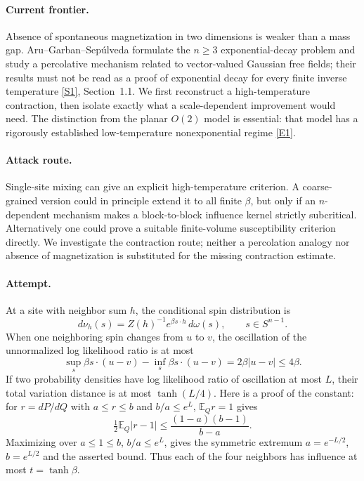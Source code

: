 \documentclass[11pt,a4paper]{article}
\newcommand{\E}{\mathbb{E}}
\newcommand{\sref}[2]{\hyperlink{source:#1:#2}{[S#2]}}
\newcommand{\eref}[2]{\hyperlink{extra:#1:#2}{[E#2]}}
\numberwithin{equation}{section}
\begin{document}
\paragraph{Current frontier.}
Absence of spontaneous magnetization in two dimensions is weaker than a mass gap. Aru--Garban--Sep\'ulveda formulate the $n\ge3$ exponential-decay problem and study a percolative mechanism related to vector-valued Gaussian free fields; their results must not be read as a proof of exponential decay for every finite inverse temperature \sref{187}{1}, Section~1.1. We first reconstruct a high-temperature contraction, then isolate exactly what a scale-dependent improvement would need. The distinction from the planar $O(2)$ model is essential: that model has a rigorously established low-temperature nonexponential regime \eref{187}{1}.

\paragraph{Attack route.}
Single-site mixing can give an explicit high-temperature criterion. A coarse-grained version could in principle extend it to all finite $\beta$, but only if an $n$-dependent mechanism makes a block-to-block influence kernel strictly subcritical. Alternatively one could prove a suitable finite-volume susceptibility criterion directly. We investigate the contraction route; neither a percolation analogy nor absence of magnetization is substituted for the missing contraction estimate.

\paragraph{Attempt.}
At a site with neighbor sum $h$, the conditional spin distribution is
\[
 d\nu_h(s)=Z(h)^{-1}e^{\beta s\cdot h}\,d\omega(s),\qquad s\in S^{n-1}.
\]
When one neighboring spin changes from $u$ to $v$, the oscillation of the unnormalized log likelihood ratio is at most
\[
 \sup_s\beta s\cdot(u-v)-\inf_s\beta s\cdot(u-v)
 =2\beta|u-v|\le4\beta.
\]
If two probability densities have log likelihood ratio of oscillation at most $L$, their total variation distance is at most $\tanh(L/4)$. Here is a proof of the constant: for $r=dP/dQ$ with $a\le r\le b$ and $b/a\le e^L$, $\E_Qr=1$ gives
\[
 \tfrac12\E_Q|r-1|\le\frac{(1-a)(b-1)}{b-a}.
\]
Maximizing over $a\le1\le b$, $b/a\le e^L$, gives the symmetric extremum $a=e^{-L/2}$, $b=e^{L/2}$ and the asserted bound. Thus each of the four neighbors has influence at most $t=\tanh\beta$.
\end{document}
